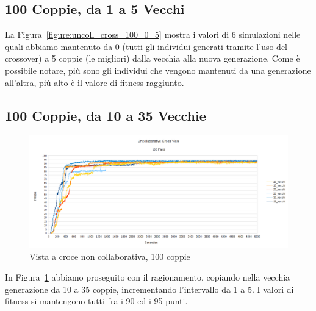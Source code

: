 \clearpage

\subsection{100 Coppie, da 1 a 5 Vecchi}
La Figura~\ref{figure:uncoll_cross_100_0_5} mostra i valori di 6 simulazioni
nelle quali abbiamo mantenuto da 0 (tutti gli individui generati tramite l'uso
del crossover) a 5 coppie (le migliori) dalla vecchia alla nuova generazione.
Come è possibile notare, più sono gli individui che vengono mantenuti da una
generazione all'altra, più alto è il valore di fitness raggiunto.

\subsection{100 Coppie, da 10 a 35 Vecchie}
\begin{figure}[ht]
	\centering
	\includegraphics[scale=0.7,angle=90]{imgs/uncollaborative_cross_100_pairs_10_35_vecchi.png}
	\caption{Vista a croce non collaborativa, 100 coppie}
	\label{figure:uncoll_cross_100_10_35}
\end{figure}
In Figura~\ref{figure:uncoll_cross_100_10_35} abbiamo proseguito con il
ragionamento, copiando nella vecchia generazione da 10 a 35 coppie,
incrementando l'intervallo da 1 a 5. I valori di fitness si mantengono tutti fra
i 90 ed i 95 punti.


